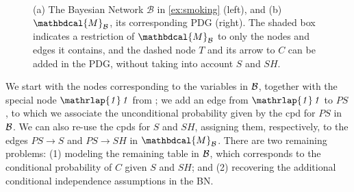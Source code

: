\documentclass[letterpaper]{article} %
\newcommand\cmergearr[4]{
		\draw[arr,-] (#1) -- (#4) -- (#2);
		\draw[arr, shorten <=0] (#4) -- (#3);
	}
\newcommand\mergearr[3]{
		\coordinate (center-#1#2#3) at (barycentric cs:#1=1,#2=1,#3=1.2);
		\cmergearr{#1}{#2}{#3}{center-#1#2#3}
	}
\theoremstyle{plain}
\theoremstyle{definition}
\theoremstyle{remark}
\newcounter{subfigure}
\newcommand{\dg}[1]{\mathbdcal{#1}}
\newcommand{\pdgunit}{\mathrlap{\mathit 1} \mspace{2.3mu}\mathit 1}
\newcommand{\PDGof}[1]{{\dg M}_{#1}}
\begin{document}
\begin{example}[emulating a BN]
\begin{figure}[ht!]
\fi
	\hfill~
	\label{subfig:smoking-pdg}
\addtocounter{figure}{-1}
\caption{ (a) The Bayesian Network $\mathcal B$ in \cref{ex:smoking} (left), and
(b) $\PDGof{\mathcal B}$, its corresponding PDG (right). The shaded box
indicates a restriction of $\PDGof{\mathcal B}$ to only the nodes and edges it
contains, and the dashed node $T$ and its arrow to $C$ can be added in the PDG,
without taking into account $S$ and $SH$.}
\label{fig:smoking-bn+pdg}
\end{figure}

We start with the nodes corresponding to the variables in $\cal B$, together
with the special node $\pdgunit$ from ; we add an edge
from ${\pdgunit}$ to $\mathit{PS}$, to which we associate the unconditional
probability given by the cpd for $\mathit{PS}$ in $\cal B$. We can also re-use
the cpds for $S$ and $\mathit{SH}$, assigning them, respectively, to the edges
$PS \to S$ and $PS \to SH$ in $\PDGof{{\mathcal B}}$.
There are two remaining problems: (1) modeling the remaining table in $\cal B$,
which corresponds to the conditional probability of $C$ given $S$ and $SH$; and
(2) recovering the additional
conditional
independence assumptions in the BN. 


\end{example}
\end{document}
